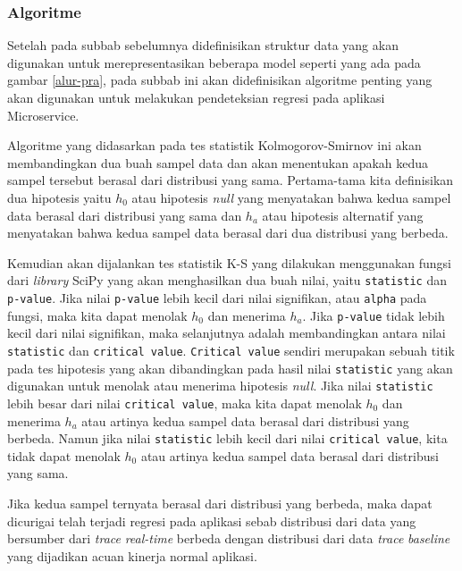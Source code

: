 \subsubsection{Algoritme}
Setelah pada subbab sebelumnya didefinisikan struktur data yang akan digunakan untuk merepresentasikan beberapa model seperti yang ada pada gambar \ref{alur-pra}, pada subbab ini akan didefinisikan algoritme penting yang akan digunakan untuk melakukan pendeteksian regresi pada aplikasi Microservice. 

Algoritme yang didasarkan pada tes statistik Kolmogorov-Smirnov ini akan membandingkan dua buah sampel data dan akan menentukan apakah kedua sampel tersebut berasal dari distribusi yang sama. Pertama-tama kita definisikan dua hipotesis yaitu $h_{0}$ atau hipotesis \textit{null} yang menyatakan bahwa kedua sampel data berasal dari distribusi yang sama dan $h_{a}$ atau hipotesis alternatif yang menyatakan bahwa kedua sampel data berasal dari dua distribusi yang berbeda. 

Kemudian akan dijalankan tes statistik K-S yang dilakukan menggunakan fungsi dari \textit{library}
SciPy yang akan menghasilkan dua buah nilai, yaitu \texttt{statistic} dan \texttt{p-value}. Jika nilai \texttt{p-value} lebih kecil dari nilai signifikan, atau \texttt{alpha} pada fungsi,  maka kita dapat menolak $h_{0}$ dan menerima $h_{a}$. Jika  \texttt{p-value} tidak lebih kecil dari nilai signifikan, maka selanjutnya adalah membandingkan antara nilai \texttt{statistic} dan \texttt{critical value}. \texttt{Critical value} sendiri merupakan sebuah titik pada tes hipotesis yang akan dibandingkan pada hasil nilai \texttt{statistic} yang akan digunakan untuk menolak atau menerima hipotesis \textit{null}. Jika nilai \texttt{statistic} lebih besar dari nilai \texttt{critical value}, maka kita dapat menolak $h_{0}$ dan menerima $h_{a}$ atau artinya kedua sampel data berasal dari distribusi yang berbeda. Namun jika  nilai \texttt{statistic} lebih kecil dari nilai \texttt{critical value}, kita tidak dapat menolak $h_{0}$ atau artinya kedua sampel data berasal dari distribusi yang sama.


Jika kedua sampel ternyata berasal dari distribusi yang berbeda, maka dapat dicurigai telah terjadi regresi pada aplikasi sebab distribusi dari data yang bersumber dari  \textit{trace} \textit{real-time} berbeda dengan distribusi dari data \textit{trace} \textit{baseline} yang dijadikan acuan kinerja normal aplikasi.




